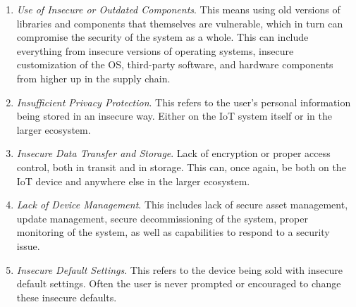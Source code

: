 \begin{enumerate}
    \item \textit{Use of Insecure or Outdated Components}. This means using old versions of libraries and components that themselves are vulnerable, which in turn can compromise the security of the system as a whole. This can include everything from insecure versions of operating systems, insecure customization of the OS, third-party software, and hardware components from higher up in the supply chain.
    
    \item \textit{Insufficient Privacy Protection}. This refers to the user's personal information being stored in an insecure way. Either on the IoT system itself or in the larger ecosystem.
    
    \item \textit{Insecure Data Transfer and Storage}. Lack of encryption or proper access control, both in transit and in storage. This can, once again, be both on the IoT device and anywhere else in the larger ecosystem.
    
    \item \textit{Lack of Device Management}. This includes lack of secure asset management, update management, secure decommissioning of the system, proper monitoring of the system, as well as capabilities to respond to a security issue.
    
    \item \textit{Insecure Default Settings}. This refers to the device being sold with insecure default settings. Often the user is never prompted or encouraged to change these insecure defaults. 
    

\end{enumerate}

